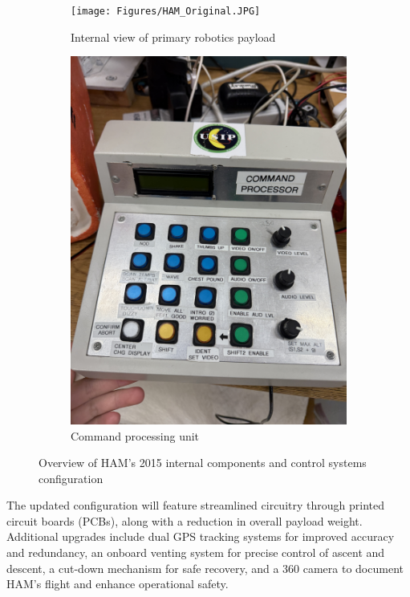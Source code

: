 \begin{figure}[H]
    \centering
    \begin{subfigure}[t]{0.49\textwidth}
        \centering
        \texttt{[image: Figures/HAM\_Original.JPG]}
        \caption{Internal view of primary robotics payload}
        \label{Fig:HAB_2015_Inside}
    \end{subfigure}
    \hfill
    \begin{subfigure}[t]{0.49\textwidth}
        \centering
        \includegraphics[width=\textwidth, angle=-90]{Figures/Command_Processor.JPG}
        \caption{Command processing unit}
        \label{Fig:HAB_2015_Command}
    \end{subfigure}
    \caption{Overview of HAM's 2015 internal components and control systems configuration}
    \label{Fig:HAB_2015_Combined}
\end{figure}
\vspace{-2em}

The updated configuration will feature streamlined circuitry through printed circuit boards (PCBs), along with a reduction in overall payload weight. Additional upgrades include dual GPS tracking systems for improved accuracy and redundancy, an onboard venting system for precise control of ascent and descent, a cut-down mechanism for safe recovery, and a 360\degree{} camera to document HAM’s flight and enhance operational safety. \par

